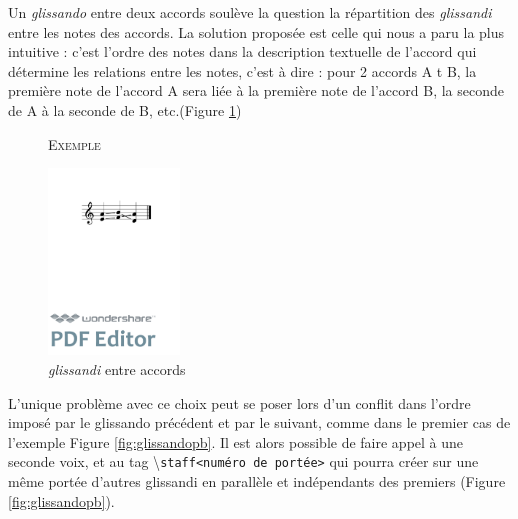 \documentclass{article}
\newenvironment{gmncode}	{\vspace{-2mm}\small\verbatim}{\endverbatim\vspace{-2mm}}
\newcommand{\code}[1]		{{\small \texttt{#1}}}
\newcommand{\guidotag}[1]	{\textbackslash\code{#1}}
\newcommand{\exemple}		{\vspace{2mm}\hspace*{-6mm}\textsc{Exemple}}
\begin{document}
Un \emph{glissando} entre deux accords soulève la question la répartition des \emph{glissandi} entre les notes des accords. La solution proposée est celle qui nous a paru la plus intuitive : c'est l'ordre des notes dans la description textuelle de l'accord qui détermine les relations entre les notes, c'est à dire : pour 2 accords A t B, la première note de l'accord A sera liée à la première note de l'accord B, la seconde de A à la seconde de B, etc.(Figure \ref{fig:glissandosimple})


\begin{figure}[h]
\exemple
\begin{center}
\begin{gmncode}
[ \glissando({e,a} {f,b} {a,d}) ]
\end{gmncode}
\bigskip

\includegraphics[width=35mm]{img/glissandosimple.pdf}
\caption{\emph{glissandi} entre accords}
\label{fig:glissandosimple}
\end{center}
\end{figure}

L'unique problème avec ce choix peut se poser lors d'un conflit dans l'ordre imposé par le glissando précédent et par le suivant, comme dans le premier cas de l'exemple Figure \ref{fig:glissandopb}. Il est alors possible de faire appel à une seconde voix, et au tag \guidotag{staff\textless{}numéro de portée\textgreater{}} qui pourra créer sur une même portée d'autres glissandi en parallèle et indépendants des premiers (Figure \ref{fig:glissandopb}).
\end{document}

